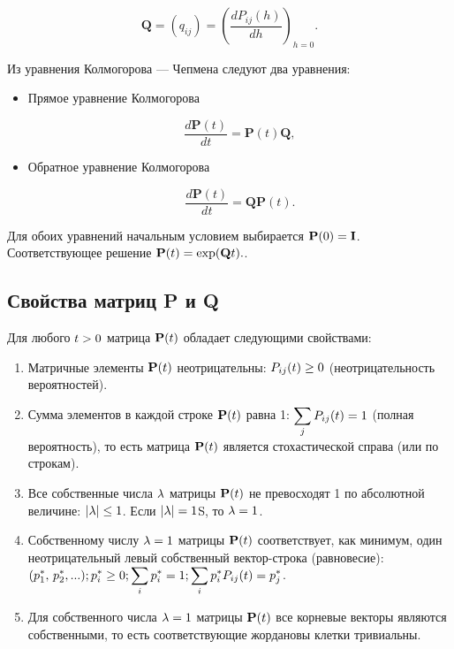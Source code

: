 \documentclass{article}
\begin{document}
\begin{equation*}
	{\mathbf  {Q}}=(q_{{ij}})=\left({\frac  {dP_{{ij}}(h)}{dh}}\right)_{{h=0}}. 
\end{equation*}

Из уравнения Колмогорова — Чепмена следуют два уравнения:

\begin{itemize}
	\item Прямое уравнение Колмогорова
	
	\begin{equation*}
		{\frac  {d{\mathbf  {P}}(t)}{dt}}={\mathbf  {P}}(t){\mathbf  {Q}},
	\end{equation*}
	
	\item Обратное уравнение Колмогорова
	
	\begin{equation*}
		{\frac  {d{\mathbf  {P}}(t)}{dt}}={\mathbf  {Q}}{\mathbf  {P}}(t). 
	\end{equation*}
\end{itemize}

Для обоих уравнений начальным условием выбирается ${\displaystyle \mathbf {P} (0)=\mathbf {I} }$. Соответствующее решение ${\displaystyle \mathbf {P} (t)=\exp(\mathbf {Q} t).}$.

\subsection{Свойства матриц P и Q}

Для любого ${\displaystyle t>0}$ матрица ${\displaystyle \mathbf {P} (t)}$ обладает следующими свойствами:

\begin{enumerate}
	\item Матричные элементы ${\displaystyle \mathbf {P} (t)}$ неотрицательны: ${\displaystyle P_{ij}(t)\geq 0}$ (неотрицательность вероятностей).	
	\item Сумма элементов в каждой строке ${\displaystyle \mathbf {P} (t)}$ равна 1: ${\displaystyle \sum _{j}P_{ij}(t)=1}$ (полная вероятность), то есть матрица ${\displaystyle \mathbf {P} (t)}$ является стохастической справа (или по строкам).
	\item Все собственные числа ${\displaystyle \lambda }$  матрицы ${\displaystyle \mathbf {P} (t)}$ не превосходят 1 по абсолютной величине: ${\displaystyle |\lambda |\leq 1}$. Если ${\displaystyle |\lambda |=1}$S, то ${\displaystyle \lambda =1}$.
	\item Собственному числу ${\displaystyle \lambda =1}$ матрицы ${\displaystyle \mathbf {P} (t)}$ соответствует, как минимум, один неотрицательный левый собственный вектор-строка (равновесие): ${\displaystyle (p_{1}^{*},\,p_{2}^{*},...); p_{i}^{*}\geq 0; \sum _{i}p_{i}^{*}=1; \sum _{i}p_{i}^{*}P_{ij}(t)=p_{j}^{*}}$.
	\item Для собственного числа ${\displaystyle \lambda =1}$ матрицы ${\displaystyle \mathbf {P} (t)}$ все корневые векторы являются собственными, то есть соответствующие жордановы клетки тривиальны.
\end{enumerate}
\end{document}
